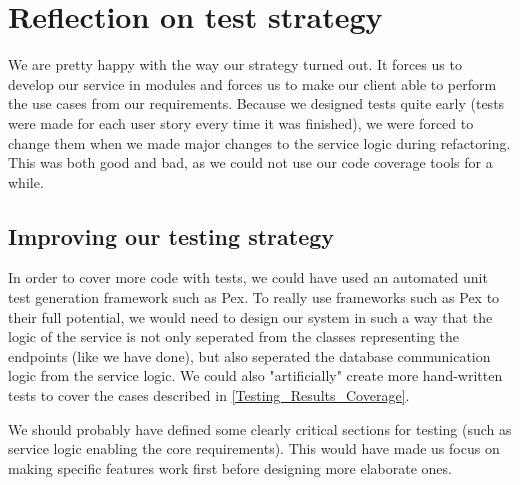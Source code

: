 \section{Reflection on test strategy}
\label{Testing_Reflection}
We are pretty happy with the way our strategy turned out. It forces us to develop our service in modules and forces us to make our client able to perform the use cases from our requirements. Because we designed tests quite early (tests were made for each user story every time it was finished), we were forced to change them when we made major changes to the service logic during refactoring. This was both good and bad, as we could not use our code coverage tools for a while.
\subsection{Improving our testing strategy}
\label{Testing_Reflection_improvements}
In order to cover more code with tests, we could have used an automated unit test generation framework such as Pex\cite{PEX}. To really use frameworks such as Pex to their full potential, we would need to design our system in such a way that the logic of the service is not only seperated from the classes representing the endpoints (like we have done), but also seperated the database communication logic from the service logic. We could also "artificially" create more hand-written tests to cover the cases described in \ref{Testing_Results_Coverage}.

We should probably have defined some clearly critical sections for testing (such as service logic enabling the core requirements). This would have made us focus on making specific features work first before designing more elaborate ones.
